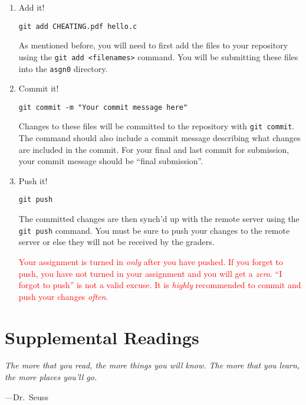 \documentclass[11pt]{article}
\newcommand\asgn[0]{asgn0}
\begin{document}
\begin{enumerate}
\item Add it!
\begin{lstlisting}
git add CHEATING.pdf hello.c
\end{lstlisting}
As mentioned before, you will need to first add the files to
your repository using the \texttt{git add <filenames>} command. You
will be submitting these files into the \texttt{\asgn}
directory.

\item Commit it!
\begin{lstlisting}
git commit -m "Your commit message here"
\end{lstlisting}
Changes to these files will be committed to the repository with
\texttt{git commit}. The command should also include a commit message
describing what changes are included in the commit. For your final and last commit for submission, your commit message should be ``final submission''.

\item Push it!
\begin{lstlisting}
git push
\end{lstlisting}
The committed changes are then synch'd up with the remote server
using the \texttt{git push} command. You must be sure to push your
changes to the remote server or else they will not be received by
the graders.

\textcolor{red}{Your assignment is turned in \emph{only} after you have pushed.
If you forget to push, you have not turned in your assignment and you will get
a \emph{zero}. ``I forgot to push'' is not a valid excuse. It is \emph{highly} recommended to commit and push your changes \emph{often}.}
\end{enumerate}

\section{Supplemental Readings}
\epigraph{\emph{The more that you read, the more things you will know. The
more that you learn, the more places you'll go.}}{---Dr.\ Seuss}\noindent
\end{document}
